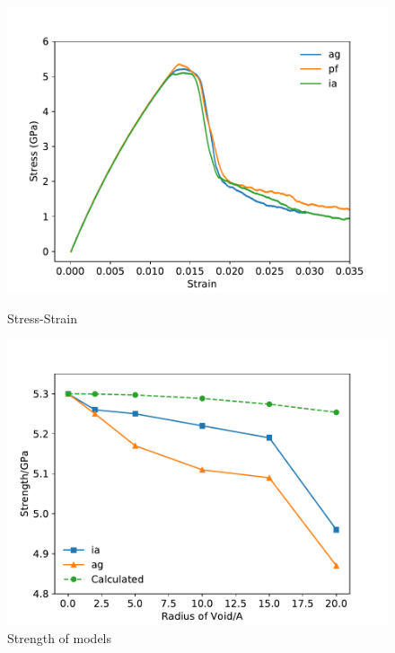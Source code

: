 \documentclass[journal,article,submit,moreauthors,pdftex,10pt,a4paper]{Definitions/mdpi}
\begin{document}
	\begin{figure}[ht]
		\centering
		\begin{minipage}{0.495\textwidth}
			\includegraphics[width=1\linewidth]{img/allline}
			\centering
			\caption{Stress-Strain}
			\label{fig:stress&strain}
		\end{minipage}	
		\hfill
		\begin{minipage}{0.495\textwidth}		
			\includegraphics[width=1\linewidth]{img/effect_of_vol}
			\centering
			\caption{Strength of models}
			\label{fig:strength}
		\end{minipage}
	\end{figure}
	
	
	
\end{document}
